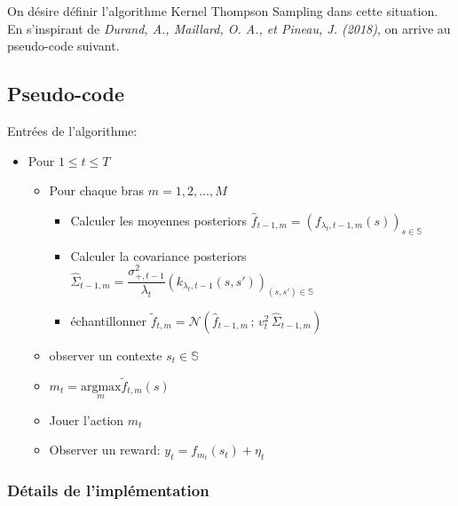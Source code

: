 \documentclass[letterpaper,11pt]{article}
\begin{document}
On désire définir l'algorithme Kernel Thompson Sampling dans cette situation. En s'inspirant de \textit{Durand, A., Maillard, O. A., et Pineau, J. (2018)}, on arrive au pseudo-code suivant.

\subsection{Pseudo-code}

Entrées de l'algorithme:\\

\begin{itemize}
\setlength\itemsep{0.2cm}

\item
Pour $1\leq t \leq T$

\begin{itemize}
\item
Pour chaque bras $m=1,2,\ldots,M$

\begin{itemize}
\item
Calculer les moyennes posteriors $\widehat{f}_{t-1,m}=(f_{\lambda_t,t-1,m}(s))_{s\in\mathbb{S}}$

\item
Calculer la covariance posteriors $\widehat{\Sigma}_{t-1,m} = \dfrac{\sigma^2_{+,t-1}}{\lambda_t}\left(k_{\lambda_t,t-1}(s,s')\right)_{(s,s')\in\mathbb{S}}$

\item
échantillonner $\widetilde{f}_{t,m}=\mathcal{N}\left(\widehat{f}_{t-1,m}\,;\,v^2_t\,\widehat{\Sigma}_{t-1,m}\right)$

\end{itemize}
\item
observer un contexte $s_t\in\mathbb{S}$

\item
$m_t = \underset{m}{\mathrm{argmax}} \tilde{f}_{t,m}(s) $

\item
Jouer l'action $m_t$

\item
Observer un reward: $y_t=f_{m_t}(s_t)+\eta_t$

\end{itemize}

\end{itemize}

\subsubsection{Détails de l'implémentation}
\end{document}
